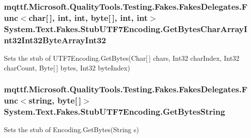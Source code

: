 \hypertarget{class_system_1_1_text_1_1_fakes_1_1_stub_u_t_f7_encoding_a55f78c6872820c94ef1b4673291c0282}{
\subsubsection[{Get\-Bytes\-Char\-Array\-Int32\-Int32\-Byte\-Array\-Int32}]{\setlength{\rightskip}{0pt plus 5cm}mqttf.\-Microsoft.\-Quality\-Tools.\-Testing.\-Fakes.\-Fakes\-Delegates.\-Func$<$char\mbox{[}$\,$\mbox{]}, int, int, byte\mbox{[}$\,$\mbox{]}, int, int$>$ System.\-Text.\-Fakes.\-Stub\-U\-T\-F7\-Encoding.\-Get\-Bytes\-Char\-Array\-Int32\-Int32\-Byte\-Array\-Int32}}\label{class_system_1_1_text_1_1_fakes_1_1_stub_u_t_f7_encoding_a55f78c6872820c94ef1b4673291c0282}


Sets the stub of U\-T\-F7\-Encoding.\-Get\-Bytes(\-Char\mbox{[}$\,$\mbox{]} chars, Int32 char\-Index, Int32 char\-Count, Byte\mbox{[}$\,$\mbox{]} bytes, Int32 byte\-Index)

\hypertarget{class_system_1_1_text_1_1_fakes_1_1_stub_u_t_f7_encoding_a4ff41ba3874992e91635a821c71da0d3}{
\subsubsection[{Get\-Bytes\-String}]{\setlength{\rightskip}{0pt plus 5cm}mqttf.\-Microsoft.\-Quality\-Tools.\-Testing.\-Fakes.\-Fakes\-Delegates.\-Func$<$string, byte\mbox{[}$\,$\mbox{]}$>$ System.\-Text.\-Fakes.\-Stub\-U\-T\-F7\-Encoding.\-Get\-Bytes\-String}}\label{class_system_1_1_text_1_1_fakes_1_1_stub_u_t_f7_encoding_a4ff41ba3874992e91635a821c71da0d3}


Sets the stub of Encoding.\-Get\-Bytes(\-String s)

